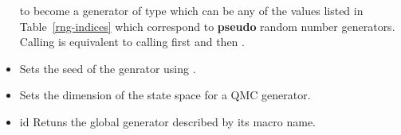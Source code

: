 \begin{itemize}
   to become a generator of type  which can be
  any of the values  listed in Table~\ref{rng-indices} which
  correspond to {\bf pseudo} random number generators.
  Calling  is equivalent to calling first
   and then . 
\item {}
  \sshortdescribe Sets the seed of the genrator  using .
\item {}
  \sshortdescribe Sets the dimension of the state space for a QMC generator.
\item {}
  { id}
  \sshortdescribe Retuns the global generator described by its macro name.
\end{itemize}


